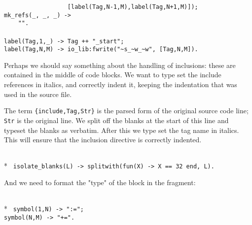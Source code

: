\begin{flushleft}
\verb&                  [label(Tag,N-1,M),label(Tag,N+1,M)]);&\\
\noindent{}%
\verb&mk_refs(_, _, _) ->&\\
\noindent{}%
\verb&    "".&\\
\noindent{}%
\verb&&\\
\noindent{}%
\verb&label(Tag,1,_) -> Tag ++ "_start";&\\
\noindent{}%
\verb&label(Tag,N,M) -> io_lib:fwrite("~s_~w_~w", [Tag,N,M]).&\\
\end{flushleft}

  Perhaps we should say something about the handling of inclusions:
these are contained in the middle of code blocks. We want to type set
the include references in italics, and correctly indent it, keeping the
indentation that was used in the source file.

  The term \verb+{include,Tag,Str}+ is the parsed form of the original
source code line; \verb+Str+ is the original line. We split off the
blanks at the start of this line and typeset the blanks as verbatim.
After this we type set the tag name in italics. This will ensure that
the inclusion directive is correctly indented.

\begin{flushleft}
\label{eweave_12_14}
\\*
\tt
\noindent{}%
\verb&isolate_blanks(L) -> splitwith(fun(X) -> X == 32 end, L).&\\
\end{flushleft}

And we need to format the "type" of the block in the fragment:

\begin{flushleft}
\label{eweave_13_14}
\\*
\tt
\noindent{}%
\verb&symbol(1,N) -> ":=";&\\
\noindent{}%
\verb&symbol(N,M) -> "+=".&\\
\end{flushleft}

